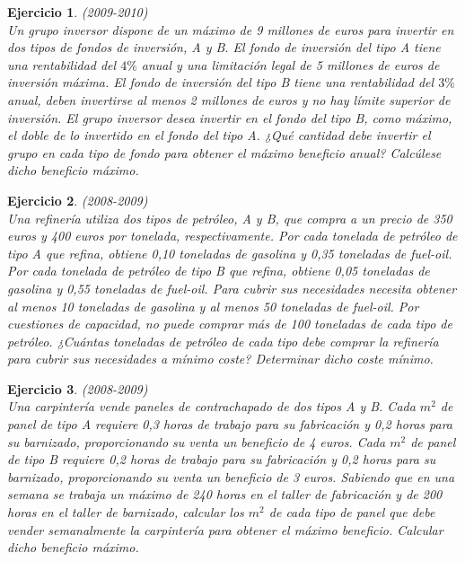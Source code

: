 \documentclass[12pt, a4paper]{amsart}
\newtheorem{ejer}{Ejercicio}
\newcommand{\s}{\color[rgb]{0,0,0.5}}
\newcommand{\n}{\color[rgb]{0,0,0}}
\begin{document}
\n

\begin{ejer}\em  (2009-2010)\\
Un grupo inversor dispone de un máximo de 9 millones de euros para invertir en dos tipos de fondos de inversión, A y B. El fondo de inversión del tipo A tiene una rentabilidad del $4\%$ anual y una limitación legal de 5 millones de euros de inversión máxima. El fondo de inversión del tipo B tiene una rentabilidad del $3\%$ anual, deben invertirse al menos 2 millones de euros y no hay límite superior de inversión. El grupo inversor desea invertir en el fondo del tipo B, como máximo, el doble de lo invertido en el fondo del tipo A. ¿Qué cantidad debe invertir el grupo en cada tipo de fondo para obtener el máximo beneficio anual? Calcúlese dicho beneficio máximo.
\end{ejer}
\s

\n



\begin{ejer}\em  (2008-2009)\\
Una refinería utiliza dos tipos de petróleo, A y B, que compra a un precio de 350 euros y 400 euros por tonelada, respectivamente. Por cada tonelada de petróleo de tipo A que refina, obtiene 0,10 toneladas de gasolina y 0,35 toneladas de fuel-oil. Por cada tonelada de petróleo de tipo B que refina, obtiene 0,05 toneladas de gasolina y 0,55 toneladas de fuel-oil. Para cubrir sus necesidades necesita obtener al menos 10 toneladas de gasolina y al menos 50 toneladas de fuel-oil. Por cuestiones de capacidad, no puede comprar más de 100 toneladas de cada tipo de petróleo. ¿Cuántas toneladas de petróleo de cada tipo debe comprar la refinería para cubrir sus necesidades a mínimo coste? Determinar dicho coste mínimo.
\end{ejer}

\begin{ejer}\em  (2008-2009)\\
Una carpintería vende paneles de contrachapado de dos tipos A y B. Cada $m^2$ de panel de tipo A requiere 0,3 horas de trabajo para su fabricación y 0,2 horas para su barnizado, proporcionando su venta un beneficio de 4 euros. Cada $m^2$ de panel de tipo B requiere 0,2 horas de trabajo para su fabricación y 0,2 horas para su barnizado, proporcionando su venta un beneficio de 3 euros. Sabiendo que en una semana se trabaja un máximo de 240 horas en el taller de fabricación y de 200 horas en el taller de barnizado, calcular los $m^2$ de cada tipo de panel que debe vender semanalmente la carpintería para obtener el máximo beneficio. Calcular dicho beneficio máximo.
\end{ejer}
\end{document}
